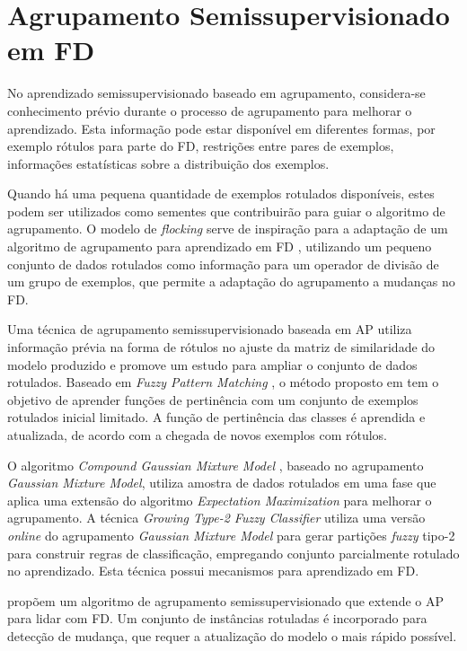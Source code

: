 \section{Agrupamento Semissupervisionado em FD}

No aprendizado semissupervisionado baseado em agrupamento, considera-se conhecimento prévio durante o processo de agrupamento para melhorar o aprendizado. Esta informação pode estar disponível em diferentes formas, por exemplo rótulos para parte do FD, restrições entre pares de exemplos, informações estatísticas sobre a distribuição dos exemplos.

Quando há uma pequena quantidade de exemplos rotulados disponíveis, estes podem ser utilizados como sementes que contribuirão para guiar o algoritmo de agrupamento. O modelo de \emph{flocking} serve de inspiração para a adaptação de um algoritmo de agrupamento para aprendizado em FD \cite{Bruneau2009}, utilizando um pequeno conjunto de dados rotulados como informação para um operador de divisão de um grupo de exemplos, que permite a adaptação do agrupamento a mudanças no FD.

Uma técnica de agrupamento semissupervisionado baseada em AP \cite{Shi2009} utiliza informação prévia na forma de rótulos no ajuste da matriz de similaridade do modelo produzido e promove um estudo para ampliar o conjunto de dados rotulados. Baseado em \emph{Fuzzy Pattern Matching} \cite{Cayrol1982,Dubois1988}, o método proposto em \cite{Mouchaweh2010} tem o objetivo de aprender funções de pertinência com um conjunto de exemplos rotulados inicial limitado. A função de pertinência das classes é aprendida e atualizada, de acordo com a chegada de novos exemplos com rótulos.

O algoritmo \emph{Compound Gaussian Mixture Model} \cite{Gao2010}, baseado no agrupamento \emph{Gaussian Mixture Model}, utiliza amostra de dados rotulados em uma fase que aplica uma extensão do algoritmo \emph{Expectation Maximization} \cite{Zhou2007} para melhorar o agrupamento. A técnica \emph{Growing Type-2 Fuzzy Classifier} \cite{Bouchachia2014} utiliza uma versão \emph{online} do agrupamento \emph{Gaussian Mixture Model} para gerar partições \emph{fuzzy} tipo-2 \cite{Mendel2002} para construir regras de classificação, empregando conjunto parcialmente rotulado no aprendizado. Esta técnica possui mecanismos para aprendizado em FD.

 propõem um algoritmo de agrupamento semissupervisionado que extende o AP para lidar com FD. Um conjunto de instâncias rotuladas é incorporado para detecção de mudança, que requer a atualização do modelo o mais rápido possível. 


